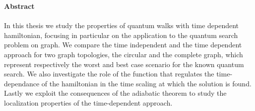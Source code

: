 \newpage
\thispagestyle{empty}
\textbf{\Large{Abstract}} \\ \\
\noindent
In this thesis we study the properties of quantum walks with time dependent hamiltonian, focusing in particular on the application to the quantum search problem on graph. We compare the time independent and the time dependent approach for two graph topologies, the circular and the complete graph, which represent respectively the worst and best case scenario for the known quantum search. We also investigate the role of the function that regulates the time-dependance of the hamiltonian in the time scaling at which the solution is found. Lastly we exploit the consequences of the adiabatic theorem to study the localization properties of the time-dependent approach.